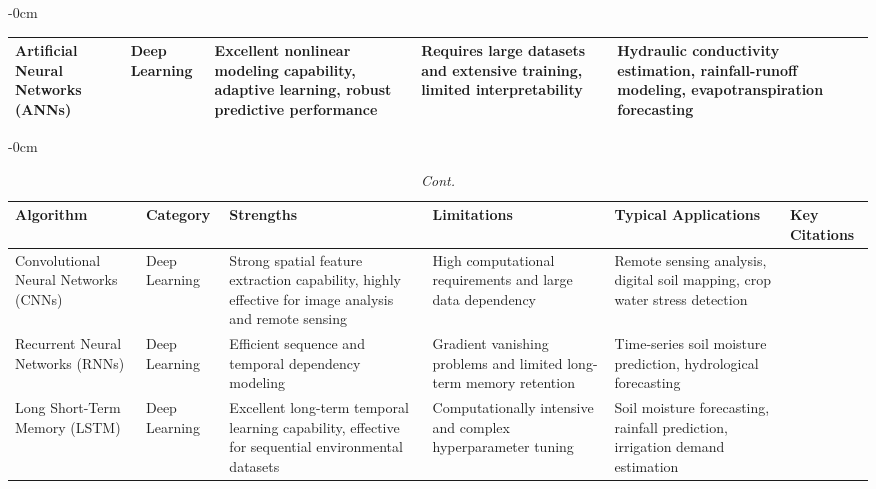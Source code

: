 \documentclass[land,review,accept,pdftex,oneauthor]{Definitions/mdpi}
\begin{document}
\begin{table}[H]
\begin{adjustwidth}{-\extralength}{0cm}
\begin{minipage}{\fulllength}
\begin{tabularx}{\textwidth}{m{2.4cm}<{\raggedright}m{2cm}<{\raggedright}m{3.2cm}<{\raggedright}m{3.2cm}<{\raggedright}m{3.2cm}<{\raggedright}m{1.8cm}<{\raggedright}}
Artificial Neural Networks (ANNs) &
Deep Learning &
Excellent nonlinear modeling capability, adaptive learning, robust predictive performance &
Requires large datasets and extensive training, limited interpretability &
Hydraulic conductivity estimation, rainfall-runoff modeling, evapotranspiration forecasting &
\citep{Hornik1989,Maier2000,Govindaraju2000,ASCE2000,Dawson2001} \\ 




\bottomrule
\end{tabularx}
\end{minipage}
\end{adjustwidth}
\end{table}

\begin{table}[H]\ContinuedFloat

\caption{{\em Cont.}}
\footnotesize
\begin{adjustwidth}{-\extralength}{0cm}
\begin{minipage}{\fulllength}
\begin{tabularx}{\textwidth}{m{2.4cm}<{\raggedright}m{2cm}<{\raggedright}m{3.2cm}<{\raggedright}m{3.2cm}<{\raggedright}m{3.2cm}<{\raggedright}m{1.8cm}<{\raggedright}}
\toprule
Algorithm &
Category &
Strengths &
Limitations &
Typical Applications &
Key Citations \\
\midrule

Convolutional Neural Networks (CNNs) &
Deep Learning &
Strong spatial feature extraction capability, highly effective for image analysis and remote sensing &
High computational requirements and large data dependency &
Remote sensing analysis, digital soil mapping, crop water stress detection &
\citep{lecun2015deep,Schmidhuber2015,Padarian2019,ai5020033,Krizhevsky2017,Ng2019} \\ 
\midrule
Recurrent Neural Networks (RNNs) &
Deep Learning &
Efficient sequence and temporal dependency modeling &
Gradient vanishing problems and limited long-term memory retention &
Time-series soil moisture prediction, hydrological forecasting &
\citep{Jordan1986,Elman1990,Coulibaly2001,hydrology12080207,Medsker2001} \\ 
\midrule

Long Short-Term Memory (LSTM) &
Deep Learning &
Excellent long-term temporal learning capability, effective for sequential environmental datasets &
Computationally intensive and complex hyperparameter tuning &
Soil moisture forecasting, rainfall prediction, irrigation demand estimation &
\citep{Hochreiter1997,Kratzert2018,Fang2017,Zhang2019_LSTM,Aetal} \\
\midrule


\end{tabularx}
\end{minipage}
\end{adjustwidth}
\end{table}
\end{document}
